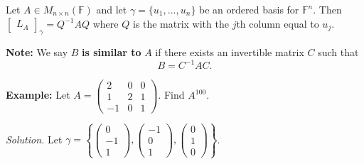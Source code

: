 \documentclass[12pt]{article}
\newenvironment{corollary}[2][Corollary]{\begin{trivlist}
\item[\hskip \labelsep {\bfseries #1}\hskip \labelsep {\bfseries #2}]}{\end{trivlist}}
\begin{document}
\begin{corollary}{26}
Let $A \in M_{n \times n}(\mathbb{F})$ and let $\gamma = \{u_1, \dots, u_n\}$ be an ordered basis for $\mathbb{F}^n$. Then $\begin{bmatrix} L_A \end{bmatrix}_\gamma = Q^{-1}AQ$ where $Q$ is the matrix with the $j$th column equal to $u_j$. 
\end{corollary}

\noindent\textbf{Note:} We say $B$ \textbf{is similar to} $A$ if there exists an invertible matrix $C$ such that $$B = C^{-1}AC.$$ 

\noindent\textbf{Example:} Let $A = \begin{pmatrix}
2 & 0 & 0 \\ 1 & 2 & 1 \\ -1 & 0 & 1
\end{pmatrix}$. Find $A^{100}$.

\textit{Solution.} Let $\gamma = \left\{ \begin{pmatrix}
0 \\ -1 \\ 1
\end{pmatrix}, \begin{pmatrix}
-1 \\ 0 \\ 1
\end{pmatrix}, \begin{pmatrix}
0 \\ 1 \\ 0
\end{pmatrix} \right\}$.
\end{document}
